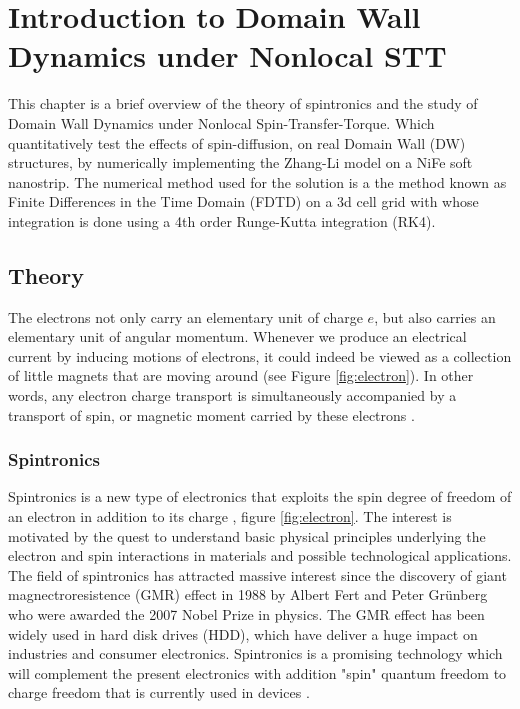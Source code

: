 
\chapter{Introduction to Domain Wall Dynamics under Nonlocal STT} %

\label{Introduction to Domain Wall Dynamics under Nonlocal STT} %



This chapter is a brief overview of the theory of spintronics and the study of Domain Wall Dynamics under Nonlocal Spin-Transfer-Torque. Which quantitatively test the effects of spin-diffusion, on real Domain Wall (DW) structures, by numerically implementing the Zhang-Li model on a NiFe soft nanostrip. The numerical method used for the solution is a the method known as Finite Differences in the Time Domain (FDTD) on a 3d cell grid with whose integration is done using a 4th order Runge-Kutta integration (RK4).

\section{Theory}

 The electrons not only carry an elementary
unit of charge $e$, but also carries an elementary unit of angular momentum. Whenever we produce an electrical current by inducing
motions of electrons, it could indeed be viewed as a collection of little magnets that are moving around (see Figure \ref{fig:electron}). In other words, any electron charge transport is simultaneously accompanied by a transport of spin, or magnetic moment carried by these electrons \cite{cornell}.

\subsection{Spintronics}

Spintronics is a new type of electronics that exploits the spin degree of freedom of an electron in addition to its charge \cite{spinz},  figure \ref{fig:electron}. The interest is motivated by the quest to understand basic physical principles underlying the electron and spin interactions in materials and possible technological applications. The field of spintronics has attracted massive interest since the discovery of giant magnectroresistence (GMR) effect in 1988 by Albert Fert and Peter Gr\"{u}nberg who were awarded the 2007 Nobel Prize in physics. The GMR effect has been widely used in hard disk drives (HDD), which have deliver a huge impact on industries and consumer electronics. Spintronics is a promising technology which will complement the present electronics with addition "spin" quantum freedom to charge freedom that is currently used in devices \cite{nonlocalspin}.

